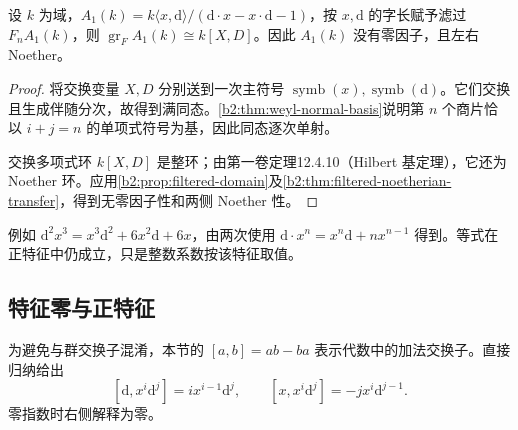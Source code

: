\begin{proposition}\label{b2:prop:weyl-associated-graded}
	设 \(k\) 为域，\(A_1(k)=k\langle x,\mathrm{d}\rangle/(\mathrm{d}\cdot x-x\cdot\mathrm{d}-1)\)，按 \(x,\mathrm{d}\) 的字长赋予滤过 \(F_nA_1(k)\)，则 \(\operatorname{gr}_F A_1(k)\cong k[X,D]\)。因此 \(A_1(k)\) 没有零因子，且左右 Noether。
\end{proposition}
\begin{proof}
	将交换变量 \(X,D\) 分别送到一次主符号 \(\operatorname{symb}(x),\operatorname{symb}(\mathrm{d})\)。它们交换且生成伴随分次，故得到满同态。\cref{b2:thm:weyl-normal-basis}说明第 \(n\) 个商片恰以 \(i+j=n\) 的单项式符号为基，因此同态逐次单射。

	交换多项式环 \(k[X,D]\) 是整环；由第一卷定理12.4.10（Hilbert 基定理），它还为 Noether 环。应用\cref{b2:prop:filtered-domain}及\cref{b2:thm:filtered-noetherian-transfer}，得到无零因子性和两侧 Noether 性。
\end{proof}

例如 \(\mathrm{d}^2x^3=x^3\mathrm{d}^2+6x^2\mathrm{d}+6x\)，由两次使用 \(\mathrm{d}\cdot x^n=x^n\mathrm{d}+nx^{n-1}\) 得到。等式在正特征中仍成立，只是整数系数按该特征取值。

\subsection{特征零与正特征}
\label{b2:subsec:2002:03}

为避免与群交换子混淆，本节的 \([a,b]=ab-ba\) 表示代数中的加法交换子。直接归纳给出
\begin{equation}\label{b2:eq:weyl-commutators}
	[\mathrm{d},x^i\mathrm{d}^j]=i x^{i-1}\mathrm{d}^j,\qquad [x,x^i\mathrm{d}^j]=-j x^i\mathrm{d}^{j-1}.
\end{equation}
零指数时右侧解释为零。

